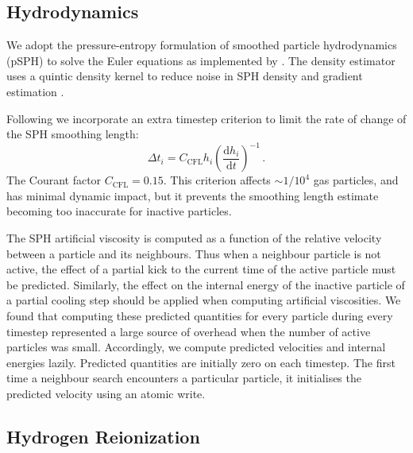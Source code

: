 \documentclass[fleqn,usenatbib]{mnras}
\begin{document}
\subsection{Hydrodynamics}

We adopt the pressure-entropy formulation of smoothed particle hydrodynamics (pSPH) to solve the Euler equations \citep{2013MNRAS.428.2840H,2010MNRAS.405.1513R} as implemented by \cite{2014MNRAS.440.1865F}. The density estimator uses a quintic density kernel to reduce noise in SPH density and gradient estimation \citep{2012JCoPh.231..759P}.

Following \cite{2020arXiv201003567S} we incorporate an extra timestep criterion to limit the rate of change of the SPH smoothing length:
\begin{equation}
    \Delta t_i = C_\mathrm{CFL} h_i\left(\frac{\mathrm{d} h_i}{\mathrm{d}t}\right)^{-1}\,.
\end{equation}
The Courant factor $C_\mathrm{CFL} = 0.15$. This criterion affects $\sim 1/10^{4}$ gas particles, and has minimal dynamic impact, but it prevents the smoothing length estimate becoming too inaccurate for inactive particles.

The SPH artificial viscosity is computed as a function of the relative velocity between a particle and its neighbours. Thus when a neighbour particle is not active, the effect of a partial kick to the current time of the active particle must be predicted. Similarly, the effect on the internal energy of the inactive particle of a partial cooling step should be applied when computing artificial viscosities. We found that computing these predicted quantities for every particle during every timestep represented a large source of overhead when the number of active particles was small. Accordingly, we compute predicted velocities and internal energies lazily. Predicted quantities are initially zero on each timestep. The first time a neighbour search encounters a particular particle, it initialises the predicted velocity using an atomic write.

\subsection{Hydrogen Reionization}
\label{sec:hydrogen}
\end{document}
